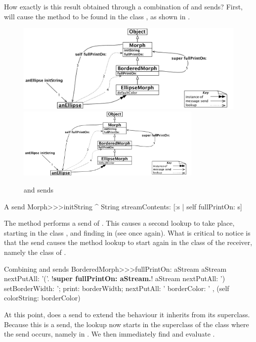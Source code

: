 \documentclass[a4paper,10pt,twoside]{book}
\begin{document}
How exactly is this result obtained through a combination of \self and \super sends?
First,  will cause the method  to be found in the class ,
as shown in .

\begin{figure}[htb]
\begin{center}
\ifluluelse
	{\includegraphics[width=\textwidth]{initStringLookup}}
	{\includegraphics[width=0.8\textwidth]{initStringLookup}}
\caption{\self and \super sends\label{fig:initStringLookup}}
\end{center}
\end{figure}

\begin{method}[initString]{A \self send}
Morph>>>initString
	^ String streamContents: [:s | self fullPrintOn: s]
\end{method}
The method  performs a \self send of .
This causes a second lookup to take place, starting in the class , and finding  in  (see  once again).
What is critical to notice is that the \self send causes the method lookup to start again in the class of the receiver, namely the class of .


\begin{method}[fullPrintOn]{Combining \super and \self sends}
BorderedMorph>>>fullPrintOn: aStream
	aStream nextPutAll: '('.
	!\textbf{super fullPrintOn: aStream.}!
	aStream nextPutAll: ') setBorderWidth: '; print: borderWidth;
		nextPutAll: ' borderColor: ' , (self colorString: borderColor)
\end{method}
At this point,  does a \super send to extend the 
 behaviour it inherits from its superclass.
Because this is a \super send, the lookup now starts in the superclass of the class where the \super send occurs, namely in .
We then immediately find and evaluate .
\end{document}
